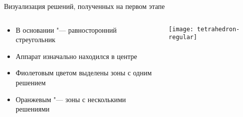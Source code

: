 \documentclass[russian,hyperref={unicode}]{beamer}
\begin{document}
  \frame{\titlepage}

  \appendix
  \begin{frame}{Визуализация решений, полученных на первом этапе}
    \begin{columns}[c]
      \begin{column}{.5\textwidth}
        \begin{itemize}
          \item В основании "--- равносторонний стреугольник
          \item Аппарат изначально находился в центре
          \item Фиолетовым цветом выделены зоны с одним решением
          \item Оранжевым "--- зоны с несколькими решениями
        \end{itemize}
      \end{column}
      \begin{column}{.5\textwidth}
        \texttt{[image: tetrahedron-regular]}
      \end{column}
    \end{columns}
  \end{frame}
\end{document}
